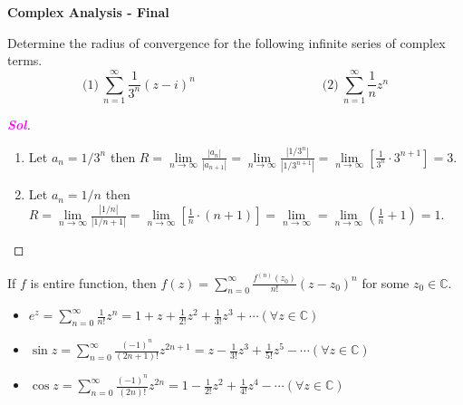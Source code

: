 \documentclass{article}
\theoremstyle{definition}
\newcommand{\C}{\mathbb{C}}
\newcommand{\of}[1]{\left( #1 \right)}
\newcommand{\abs}[1]{\left\lvert #1 \right\rvert}
\newcommand{\sol}{\textcolor{magenta}{\bf Sol}}
\begin{document}
	\begin{center}
		\huge\textbf{Complex Analysis - Final}\\
		\vspace{0.5em}
	\end{center}
	
	\begin{tcolorbox}[colback=white,colframe=white,arc=5pt,title={\color{black}\bf $\bullet$ Radius of Convergence}]
		Determine the radius of convergence for the following infinite series of complex terms. \[
		\text{(1)}\ \sum_{n=1}^{\infty}\frac{1}{3^n}(z-i)^n\quad\quad\quad\quad\quad\quad\quad\quad\quad\quad
		\text{(2)}\ \sum_{n=1}^{\infty}\frac{1}{n}z^n
		\]
	\end{tcolorbox}
	\begin{proof}[\sol]
		\begin{enumerate}[(1)]
			\item Let $a_n=1/3^n$ then $\displaystyle
			R=\lim\limits_{n\to\infty}\frac{\abs{a_n}}{\abs{a_{n+1}}}=\lim\limits_{n\to\infty}\frac{\abs{1/3^n}}{\abs{1/3^{n+1}}}=\lim\limits_{n\to\infty}\left[\frac{1}{3^n}\cdot 3^{n+1}\right]=3.$
			\item Let $a_n=1/n$ then $\displaystyle
			R=\lim\limits_{n\to\infty}\frac{\abs{1/n}}{\abs{1/n+1}}=\lim\limits_{n\to\infty}\left[\frac{1}{n}\cdot (n+1)\right]=\lim\limits_{n\to\infty}=\lim\limits_{n\to\infty}\of{\frac{1}{n}+1}=1.$
		\end{enumerate}
	\end{proof}
	\begin{tcolorbox}[colback=white,colframe=black,arc=5pt,title={\color{white}\bf Taylor Series}]
		If $f$ is entire function, then $\displaystyle
		f(z)=\sum_{n=0}^{\infty}\frac{f^{(n)}(z_0)}{n!}(z-z_0)^n
		$ for some $z_0\in\C$.
	\end{tcolorbox}
	\begin{tcolorbox}[colback=white,colframe=black,arc=5pt,title={\color{white}\bf Maclaurin's Series}]
		\begin{itemize}
			\item $\displaystyle e^z=\sum_{n=0}^{\infty}\frac{1}{n!}z^n=1+z+\frac{1}{2!}z^2+\frac{1}{3!}z^3+\cdots$\quad $(\forall z\in\C)$
			\item $\displaystyle
			\sin z=\sum_{n=0}^{\infty}\frac{(-1)^n}{(2n+1)!}z^{2n+1}=z-\frac{1}{3!}z^3+\frac{1}{5!}z^5-\cdots$\quad $(\forall z\in\C)$
			\item $\displaystyle
			\cos z=\sum_{n=0}^{\infty}\frac{(-1)^n}{(2n)!}z^{2n}=1-\frac{1}{2!}z^2+\frac{1}{4!}z^4-\cdots$\quad $(\forall z\in\C)$
		\end{itemize}
	\end{tcolorbox}
\end{document}
